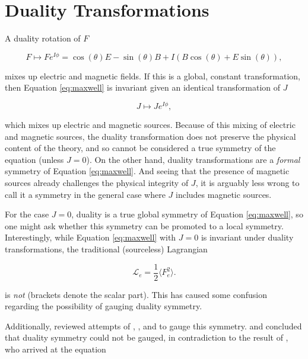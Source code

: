 \documentclass{article}
\begin{document}
  \section{Duality Transformations}

  A duality rotation of $F$

  \begin{equation}
    F \mapsto F e^{I \phi} = \cos(\theta) E - \sin(\theta) B + I(B \cos(\theta) + E \sin(\theta)),\label{eq:duality}
  \end{equation}

  mixes up electric and magnetic fields. If this is a global, constant transformation, then Equation \ref{eq:maxwell} is invariant given an identical transformation of $J$

  \begin{equation}
    J \mapsto J e^{I \phi},
  \end{equation}

  which mixes up electric and magnetic sources. Because of this mixing of electric and magnetic sources, the duality transformation does not preserve the physical content of the theory, and so cannot be considered a true symmetry of the equation (unless $J=0$). On the other hand, duality transformations are a \emph{formal} symmetry of Equation \ref{eq:maxwell}. And seeing that the presence of magnetic sources already challenges the physical integrity of $J$, it is arguably less wrong to call it a symmetry in the general case where $J$ includes magnetic sources.

  For the case $J=0$, duality is a true global symmetry of Equation \ref{eq:maxwell}, so one might ask whether this symmetry can be promoted to a local symmetry. Interestingly, while Equation \ref{eq:maxwell} with $J=0$ is invariant under duality transformations, the traditional (sourceless) Lagrangian

  \begin{equation}
    \mathcal{L}_e = \frac{1}{2} \langle F_e^2 \rangle.\label{eq:elagrangian}
  \end{equation}

  is \emph{not} (brackets denote the scalar part). This has caused some confusion regarding the possibility of gauging duality symmetry. 

  Additionally, \cite{saa} reviewed attempts of \cite{malik}, \cite{bunster}, and \cite{deser} to gauge this symmetry. \cite{bunster} and \cite{deser} concluded that duality symmetry could not be gauged, in contradiction to the result of \cite{malik}, who arrived at the equation
\end{document}
